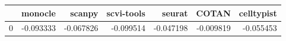 \begin{tabular}{lrrrrrr}
\toprule
 & monocle & scanpy & scvi-tools & seurat & COTAN & celltypist \\
\midrule
0 & -0.093333 & -0.067826 & -0.099514 & -0.047198 & -0.009819 & -0.055453 \\
\bottomrule
\end{tabular}
